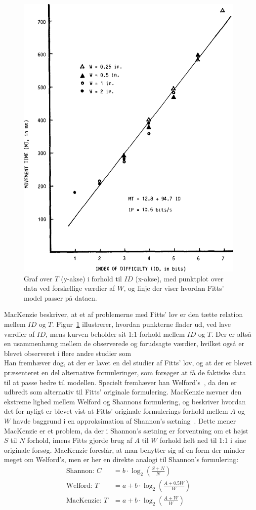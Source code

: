 \begin{figure}[h]
\centering
\includegraphics[width=.5\linewidth]{images/illustrations/mackenzie_plot_1}
\caption{Graf over $T$ (y-akse) i forhold til $ID$ (x-akse), med punktplot over data ved forskellige værdier af $W$, og linje der viser hvordan Fitts' model passer på dataen.}
\label{fig:MacKenziePlot1}
\end{figure}
MacKenzie beskriver, at et af problemerne med Fitts' lov er den tætte relation mellem $ID$ og $T$. Figur~\ref{fig:MacKenziePlot1} illustrerer, hvordan punkterne flader ud, ved lave værdier af $ID$, mens kurven beholder sit 1:1-forhold mellem $ID$ og $T$. Der er altså en usammenhæng mellem de observerede og forudsagte værdier, hvilket også er blevet observeret i flere andre studier som \cite{welford1960, buck1986, crossman1983, drury1975, klapp1975, langolf1976, meyer1988, wallace1978}\\
Han fremhæver dog, at der er lavet en del studier af Fitts' lov, og at der er blevet præsenteret en del alternative formuleringer, som forsøger at få de faktiske data til at passe bedre til modellen. Specielt fremhæver han Welford's~\cite{welford1960,welford1968}, da den er udbredt som alternativ til Fitts' originale formulering. MacKenzie nævner den ekstreme lighed mellem Welford og Shannons formulering, og beskriver hvordan det for nyligt er blevet vist at Fitts' originale formulerings forhold mellem $A$ og $W$ havde baggrund i en approksimation af Shannon's sætning~\cite[p. 388]{fitts1954}. Dette mener MacKenzie er et problem, da der i Shannon's sætning er forventning om et højst $S$ til $N$ forhold, imens Fitts gjorde brug af $A$ til $W$ forhold helt ned til 1:1 i sine originale forsøg. MacKenzie foreslår, at man benytter sig af en form der minder meget om Welford's, men er her en direkte analogi til Shannon's formulering:
\begin{align}
\text{Shannon: }C&=b\cdot\log_2{\left(\frac{S+N}{N}\right)}\\
\text{Welford: }T&=a+b\cdot\log_2{\left(\frac{A+0.5W}{W}\right)}\\
\text{MacKenzie: }T&=a+b\cdot\log_2{\left(\frac{A+W}{W}\right)}
\end{align}

